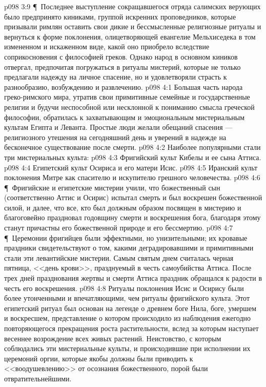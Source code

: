 \vs p098 3:9 \P\ Последнее выступление сокращавшегося отряда салимских верующих было предпринято киниками, группой искренних проповедников, которые призывали римлян оставить свои дикие и бессмысленные религиозные ритуалы и вернуться к форме поклонения, олицетворяющей евангелие Мельхиседека в том измененном и искаженном виде, какой оно приобрело вследствие соприкосновения с философией греков. Однако народ в основном киников отвергал, предпочитая погружаться в ритуалы мистерий, которые не только предлагали надежду на личное спасение, но и удовлетворяли страсть к разнообразию, возбуждению и развлечению.
\vs p098 4:1 Большая часть народа греко\hyp{}римского мира, утратив свои примитивные семейные и государственные религии и будучи неспособной или несклонной к пониманию смысла греческой философии, обратилась к захватывающим и эмоциональным мистериальным культам Египта и Леванта. Простые люди желали обещаний спасения --- религиозного утешения на сегодняшний день и уверений в надежде на бесконечное существование после смерти.
\vs p098 4:2 Наиболее популярными стали три мистериальных культа:
\vs p098 4:3 \bibnobreakspace Фригийский культ Кибелы и ее сына Аттиса.
\vs p098 4:4 \bibnobreakspace Египетский культ Осириса и его матери Исис.
\vs p098 4:5 \bibnobreakspace Иранский культ поклонения Митре как спасителю и искупителю грешного человечества.
\vs p098 4:6 \P\ Фригийские и египетские мистерии учили, что божественный сын (соответственно Аттис и Осирис) испытал смерть и был воскрешен божественной силой, и далее, что все, кто был должным образом посвящен в мистерию и благоговейно праздновал годовщину смерти и воскрешения бога, благодаря этому станут причастны его божественной природе и его бессмертию.
\vs p098 4:7 \P\ Церемонии фригийцев были эффектными, но унизительными; их кровавые праздники свидетельствуют о том, какими деградировавшими и примитивными стали эти левантийские мистерии. Самым святым днем считалась черная пятница, <<день крови>>, празднуемый в честь самоубийства Аттиса. После трех дней празднования жертвы и смерти Аттиса праздник обращался к радости в честь его воскрешения.
\vs p098 4:8 Ритуалы поклонения Исис и Осирису были более утонченными и впечатляющими, чем ритуалы фригийского культа. Этот египетский ритуал был основан на легенде о древнем боге Нила, боге, умершем и воскресшем, представление о котором происходило из наблюдения ежегодно повторяющегося прекращения роста растительности, вслед за которым наступает весеннее возрождение всех живых растений. Неистовство, с которым соблюдались эти мистериальные культы, и происходившие при исполнении их церемоний оргии, которые якобы должны были приводить к <<воодушевлению>> от осознания божественного, порой были отвратительнейшими.
